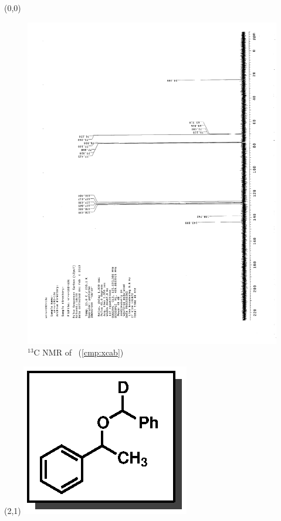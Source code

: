 \clearpage
\begin{textblock}{20}(0,0)
\begin{figure}[htb]
\caption{$^{13}$C NMR of  \CMPxcab\ (\ref{cmp:xcab})}
\includegraphics[scale=0.75, trim = 0mm 0mm 0mm 5mm,
clip]{chp_alkylation/images/nmr/xcabC}
\vspace{-100pt}
\end{figure}
\end{textblock}
\begin{textblock}{1}(2,1)
\includegraphics[scale=0.8, angle=90]{chp_alkylation/images/xcab}
\end{textblock}
\clearpage

